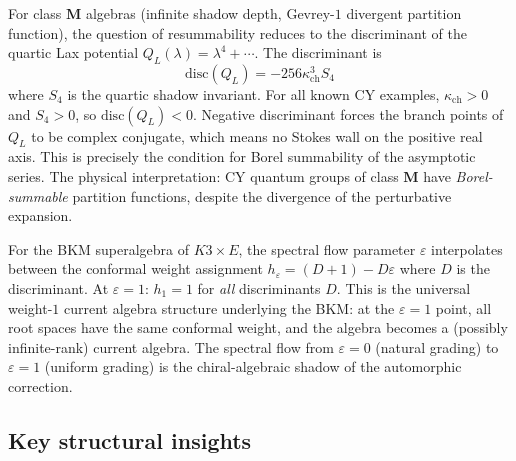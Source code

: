 \documentclass[11pt]{article}
\begin{document}
\begin{observation}
\label{obs:class-m-borel}
For class $\mathbf{M}$ algebras (infinite shadow depth, Gevrey-$1$
divergent partition function), the question of resummability reduces
to the discriminant of the quartic Lax potential
$Q_L(\lambda) = \lambda^4 + \cdots$. The discriminant is
\[
 \mathrm{disc}(Q_L) = -256 \kappa_{\mathrm{ch}}^3 S_4
\]
where $S_4$ is the quartic shadow invariant. For all known CY examples,
$\kappa_{\mathrm{ch}} > 0$ and $S_4 > 0$, so $\mathrm{disc}(Q_L) < 0$.
Negative discriminant forces the branch points of $Q_L$ to be complex
conjugate, which means no Stokes wall on the positive real axis. This
is precisely the condition for Borel summability of the asymptotic
series. The physical interpretation: CY quantum groups of class
$\mathbf{M}$ have \emph{Borel-summable} partition functions, despite
the divergence of the perturbative expansion.
\end{observation}

\begin{observation}[Borcherds spectral flow: universality of $h = 1$]
\label{obs:borcherds-spectral}
For the BKM superalgebra of $K3 \times E$, the spectral flow
parameter $\varepsilon$ interpolates between the conformal weight
assignment $h_\varepsilon = (D + 1) - D\varepsilon$ where $D$ is the
discriminant. At $\varepsilon = 1$: $h_1 = 1$ for \emph{all}
discriminants $D$. This is the universal weight-$1$ current algebra
structure underlying the BKM: at the $\varepsilon = 1$ point, all
root spaces have the same conformal weight, and the algebra becomes
a (possibly infinite-rank) current algebra. The spectral flow from
$\varepsilon = 0$ (natural grading) to $\varepsilon = 1$ (uniform
grading) is the chiral-algebraic shadow of the automorphic
correction.
\end{observation}

\subsection{Key structural insights}
\label{subsec:key-insights}
\end{document}
